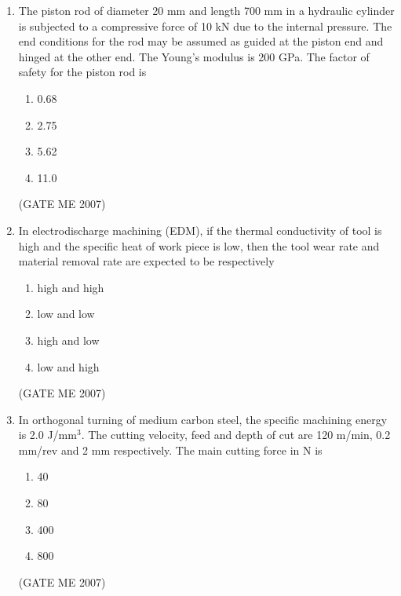 \documentclass[journal]{IEEEtran}
\begin{document}
\begin{enumerate}
\item The piston rod of diameter 20 mm and length 700 mm in a hydraulic cylinder is subjected to a compressive force of 10 kN due to the internal pressure. The end conditions for the rod may be assumed as guided at the piston end and hinged at the other end. The Young’s modulus is 200 GPa. The factor of safety for the piston rod is
\begin{multicols}{4}
\begin{enumerate}
\item 0.68
\item 2.75
\item 5.62
\item 11.0
\end{enumerate}
\end{multicols}
\hfill (GATE ME 2007)

\item In electrodischarge machining (EDM), if the thermal conductivity of tool is high and the specific heat of work piece is low, then the tool wear rate and material removal rate are expected to be respectively
\begin{multicols}{2}
\begin{enumerate}
\item high and high
\item low and low
\item high and low
\item low and high
\end{enumerate}
\end{multicols}
\hfill (GATE ME 2007)

\item In orthogonal turning of medium carbon steel, the specific machining energy is 2.0 J/mm$^3$. The cutting velocity, feed and depth of cut are 120 m/min, 0.2 mm/rev and 2 mm respectively. The main cutting force in N is
\begin{multicols}{4}
\begin{enumerate}
\item 40
\item 80
\item 400
\item 800
\end{enumerate}
\end{multicols}
\hfill (GATE ME 2007)


\end{enumerate}
\end{document}
